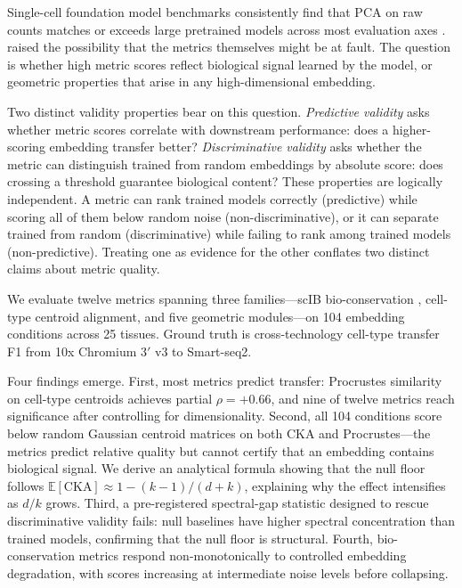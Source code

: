 \documentclass[11pt]{article}
\begin{document}
Single-cell foundation model benchmarks consistently find that PCA on
raw counts matches or exceeds large pretrained models across most
evaluation axes \citep{wu2025scfm, vcbench2026, unifiedscfm2026,
cellxgeneintegration2026}. \citet{wu2025scfm} raised the possibility
that the metrics themselves might be at fault. The question is whether
high metric scores reflect biological signal learned by the model, or
geometric properties that arise in any high-dimensional embedding.

Two distinct validity properties bear on this question. \emph{Predictive
validity} asks whether metric scores correlate with downstream
performance: does a higher-scoring embedding transfer better?
\emph{Discriminative validity} asks whether the metric can distinguish
trained from random embeddings by absolute score: does crossing a
threshold guarantee biological content? These properties are logically
independent. A metric can rank trained models correctly (predictive)
while scoring all of them below random noise (non-discriminative), or
it can separate trained from random (discriminative) while failing to
rank among trained models (non-predictive). Treating one as evidence for
the other conflates two distinct claims about metric quality.

We evaluate twelve metrics spanning three families---scIB
bio-conservation \citep{luecken2022scib}, cell-type centroid alignment,
and five geometric modules---on 104 embedding conditions across 25
tissues. Ground truth is cross-technology cell-type transfer F1 from
10x Chromium 3$'$ v3 to Smart-seq2.

Four findings emerge. First, most metrics predict transfer: Procrustes
similarity on cell-type centroids achieves partial $\rho = +0.66$, and
nine of twelve metrics reach significance after controlling for
dimensionality. Second, all 104 conditions score below random Gaussian
centroid matrices on both CKA and Procrustes---the metrics predict
relative quality but cannot certify that an embedding contains
biological signal. We derive an analytical formula showing that the null
floor follows $\mathbb{E}[\mathrm{CKA}] \approx 1 - (k{-}1)/(d{+}k)$,
explaining why the effect intensifies as $d/k$ grows. Third, a
pre-registered spectral-gap statistic designed to rescue
discriminative validity fails: null baselines have higher spectral
concentration than trained models, confirming that the null floor is
structural. Fourth, bio-conservation metrics respond non-monotonically
to controlled embedding degradation, with scores increasing at
intermediate noise levels before collapsing.
\end{document}
